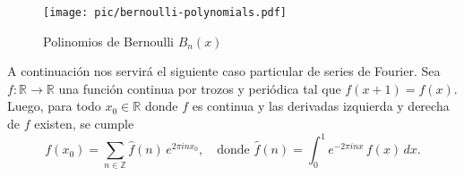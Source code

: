 \begin{figure}
  \begin{center}
    \texttt{[image: pic/bernoulli-polynomials.pdf]}
  \end{center}

  \caption{Polinomios de Bernoulli $B_n (x)$}
\end{figure}

A continuación nos servirá el siguiente caso particular de series de Fourier.
Sea $f\colon \mathbb{R} \to \mathbb{R}$ una función continua por trozos y
periódica tal que $f (x+1) = f (x)$. Luego, para todo $x_0\in \mathbb{R}$ donde
$f$ es continua y las derivadas izquierda y derecha de $f$ existen, se cumple
\[ f (x_0) = \sum_{n\in\mathbb{Z}} \widehat{f} (n) \, e^{2\pi i n x_0},
   \quad\text{donde }
   \widehat{f} (n) = \int_0^1 e^{-2\pi i n x} \, f(x) \, dx. \]

